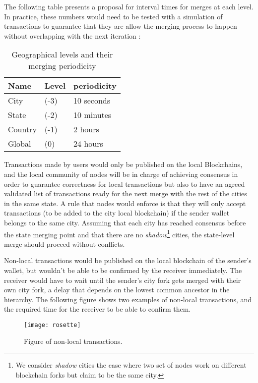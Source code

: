 The following table presents a proposal for interval times for merges at each
level.  In practice, these numbers would need to be tested with a simulation of
transactions to guarantee that they are allow the merging process to happen
without overlapping with the next iteration :

\begin{table}
\centering
\begin{tabular}{l l l}
\textbf{Name} & \textbf{Level} & \textbf{periodicity}  \\
\midrule
City  &   (-3) & 10 seconds \\
State &   (-2) & 10 minutes \\
Country & (-1) & 2 hours \\
Global  & (0)  & 24 hours \\
\end{tabular}
\caption{Geographical levels and their merging periodicity}
\end{table}

Transactions made by users would only be published on the local Blockchains,
and the local community of nodes will be in charge of achieving consensus in
order to guarantee correctness for local transactions but also to have an
agreed validated list of transactions ready for the next merge with the rest of
the cities in the same state.  A rule that nodes would enforce is that they
will only accept transactions (to be added to the city local blockchain) if the
sender wallet belongs to the same city.  Assuming that each city has reached
consensus before the state merging point and that there are no
\textit{shadow}\footnote{We consider \textit{shadow} cities the case where two set of
nodes work on different blockchain forks but claim to be the same city.}
cities, the state-level merge should proceed without conflicts.

Non-local transactions would be published on the local blockchain of the
sender's wallet, but wouldn't be able to be confirmed by the receiver
immediately.  The receiver would have to wait until the sender's city fork gets
merged with their own city fork, a delay that depends on the lowest common
ancestor in the hierarchy.  The following figure shows two examples of
non-local transactions, and the required time for the receiver to be able to
confirm them.

\begin{figure}
\texttt{[image: rosette]}
\caption{Figure of non-local transactions.}
\end{figure}

